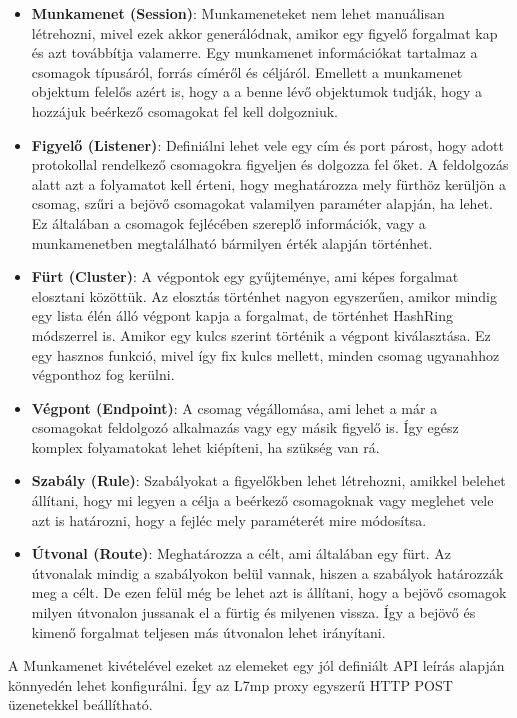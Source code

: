 \begin{itemize}
	\item \textbf{Munkamenet (Session)}: Munkameneteket nem lehet manuálisan létrehozni,
	mivel ezek akkor generálódnak, amikor egy figyelő forgalmat kap és azt 
	továbbítja valamerre. Egy munkamenet információkat tartalmaz a csomagok típusáról,
	forrás címéről és céljáról. Emellett a munkamenet objektum felelős azért is, hogy a
	a benne lévő objektumok tudják, hogy a hozzájuk beérkező csomagokat fel kell dolgozniuk. 
	\item \textbf{Figyelő (Listener)}: Definiálni lehet vele egy cím és port párost, hogy
	adott protokollal rendelkező csomagokra figyeljen és dolgozza fel őket. A feldolgozás
	alatt azt a folyamatot kell érteni, hogy meghatározza mely fürthöz kerüljön a csomag,
	szűri a bejövő csomagokat valamilyen paraméter alapján, ha lehet. Ez általában 
	a csomagok fejlécében szereplő információk, vagy a munkamenetben megtalálható bármilyen
	érték alapján történhet. 
	\item \textbf{Fürt (Cluster)}: A végpontok egy gyűjteménye, ami képes forgalmat elosztani
	közöttük. Az elosztás történhet nagyon egyszerűen, amikor mindig egy lista élén álló
	végpont kapja a forgalmat, de történhet HashRing módszerrel is. Amikor egy kulcs szerint
	történik a végpont kiválasztása. Ez egy hasznos funkció, mivel így fix kulcs mellett,
	minden csomag ugyanahhoz végponthoz fog kerülni. 
	\item \textbf{Végpont (Endpoint)}: A csomag végállomása, ami lehet a már a csomagokat
	feldolgozó alkalmazás vagy egy másik figyelő is. Így egész komplex folyamatokat 
	lehet kiépíteni, ha szükség van rá. 
	\item \textbf{Szabály (Rule)}: Szabályokat a figyelőkben lehet létrehozni, amikkel
	belehet állítani, hogy mi legyen a célja a beérkező csomagoknak vagy meglehet vele azt
	is határozni, hogy a fejléc mely paraméterét mire módosítsa. 
	\item \textbf{Útvonal (Route)}: Meghatározza a célt, ami általában egy fürt. Az 
	útvonalak mindig a szabályokon belül vannak, hiszen a szabályok határozzák meg a célt.
	De ezen felül még be lehet azt is állítani, hogy a bejövő csomagok milyen útvonalon 
	jussanak el a fürtig és milyenen vissza. Így a bejövő és kimenő forgalmat teljesen 
	más útvonalon lehet irányítani.
\end{itemize}

A Munkamenet kivételével ezeket az elemeket egy jól definiált API leírás alapján 
könnyedén lehet konfigurálni. Így az L7mp proxy egyszerű HTTP POST üzenetekkel 
beállítható.

